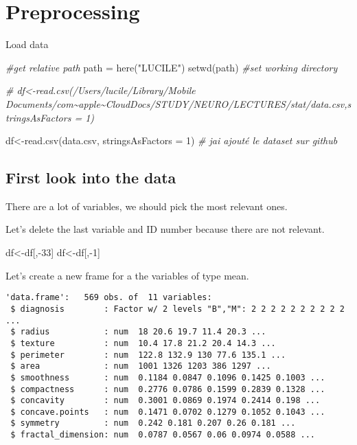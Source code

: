 \documentclass[
  11pt,
]{article}
\newenvironment{Shaded}{\begin{snugshade}}{\end{snugshade}}
\newcommand{\AttributeTok}[1]{\textcolor[rgb]{0.77,0.63,0.00}{#1}}
\newcommand{\CommentTok}[1]{\textcolor[rgb]{0.56,0.35,0.01}{\textit{#1}}}
\newcommand{\DecValTok}[1]{\textcolor[rgb]{0.00,0.00,0.81}{#1}}
\newcommand{\FunctionTok}[1]{\textcolor[rgb]{0.00,0.00,0.00}{#1}}
\newcommand{\NormalTok}[1]{#1}
\newcommand{\OtherTok}[1]{\textcolor[rgb]{0.56,0.35,0.01}{#1}}
\newcommand{\SpecialCharTok}[1]{\textcolor[rgb]{0.00,0.00,0.00}{#1}}
\newcommand{\StringTok}[1]{\textcolor[rgb]{0.31,0.60,0.02}{#1}}
\begin{document}
\hypertarget{preprocessing}{%
\section{Preprocessing}\label{preprocessing}}

Load data

\begin{Shaded}
\begin{Highlighting}[]
\CommentTok{\#get relative path}
\NormalTok{path }\OtherTok{=} \FunctionTok{here}\NormalTok{(}\StringTok{"LUCILE"}\NormalTok{)}
\FunctionTok{setwd}\NormalTok{(path) }\CommentTok{\#set working directory}

\CommentTok{\# df\textless{}{-}read.csv(\textquotesingle{}/Users/lucile/Library/Mobile Documents/com\textasciitilde{}apple\textasciitilde{}CloudDocs/STUDY/NEURO/LECTURES/stat/data.csv\textquotesingle{},stringsAsFactors = 1)}

\NormalTok{df}\OtherTok{\textless{}{-}}\FunctionTok{read.csv}\NormalTok{(}\StringTok{\textquotesingle{}data.csv\textquotesingle{}}\NormalTok{, }\AttributeTok{stringsAsFactors =} \DecValTok{1}\NormalTok{) }\CommentTok{\# j\textquotesingle{}ai  ajouté le dataset sur github}
\end{Highlighting}
\end{Shaded}

\hypertarget{first-look-into-the-data}{%
\subsection{First look into the data}\label{first-look-into-the-data}}

There are a lot of variables, we should pick the most relevant ones.

Let's delete the last variable and ID number because there are not
relevant.

\begin{Shaded}
\begin{Highlighting}[]
\NormalTok{df}\OtherTok{\textless{}{-}}\NormalTok{df[,}\SpecialCharTok{{-}}\DecValTok{33}\NormalTok{]}
\NormalTok{df}\OtherTok{\textless{}{-}}\NormalTok{df[,}\SpecialCharTok{{-}}\DecValTok{1}\NormalTok{]}
\end{Highlighting}
\end{Shaded}

Let's create a new frame for a the variables of type mean.

\begin{verbatim}
'data.frame':   569 obs. of  11 variables:
 $ diagnosis        : Factor w/ 2 levels "B","M": 2 2 2 2 2 2 2 2 2 2 ...
 $ radius           : num  18 20.6 19.7 11.4 20.3 ...
 $ texture          : num  10.4 17.8 21.2 20.4 14.3 ...
 $ perimeter        : num  122.8 132.9 130 77.6 135.1 ...
 $ area             : num  1001 1326 1203 386 1297 ...
 $ smoothness       : num  0.1184 0.0847 0.1096 0.1425 0.1003 ...
 $ compactness      : num  0.2776 0.0786 0.1599 0.2839 0.1328 ...
 $ concavity        : num  0.3001 0.0869 0.1974 0.2414 0.198 ...
 $ concave.points   : num  0.1471 0.0702 0.1279 0.1052 0.1043 ...
 $ symmetry         : num  0.242 0.181 0.207 0.26 0.181 ...
 $ fractal_dimension: num  0.0787 0.0567 0.06 0.0974 0.0588 ...
\end{verbatim}
\end{document}
